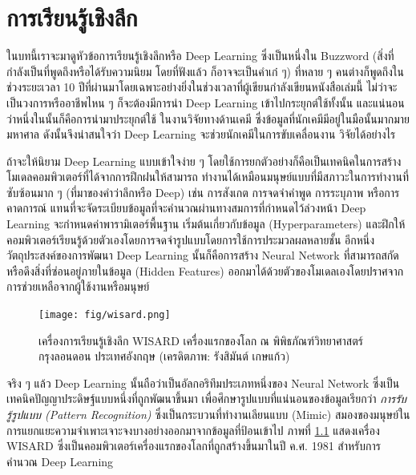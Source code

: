 

\chapter{การเรียนรู้เชิงลึก}
\label{ch:dl}

ในบทนี้เราจะมาดูหัวข้อการเรียนรู้เชิงลึกหรือ Deep Learning ซึ่งเป็นหนึ่งใน Buzzword (สิ่งที่กำลังเป็นที่พูดถึงหรือได้รับความนิยม โดยที่ฟังแล้ว%
ก็อาจจะเป็นคำเก๋ ๆ) ที่หลาย ๆ คนต่างก็พูดถึงในช่วงระยะเวลา 10 ปีที่ผ่านมาโดยเฉพาะอย่างยิ่งในช่วงเวลาที่ผู้เขียนกำลังเขียนหนังสือเล่มนี้ 
ไม่ว่าจะเป็นวงการหรืออาชีพไหน ๆ ก็จะต้องมีการนำ Deep Learning เข้าไปกระยุกต์ใช้ทั้งนั้น และแน่นอนว่าหนึ่งในนั้นก็คือการนำมาประยุกต์ใช้%
ในงานวิจัยทางด้านเคมี ซึ่งข้อมูลที่นักเคมีมีอยู่ในมือนั้นมากมายมหาศาล ดังนั้นจึงน่าสนใจว่า Deep Learning จะช่วยนักเคมีในการขับเคลื่อนงาน%
วิจัยได้อย่างไร

ถ้าจะให้นิยาม Deep Learning แบบเข้าใจง่าย ๆ โดยใช้การยกตัวอย่างก็คือเป็นเทคนิคในการสร้างโมเดลคอมพิวเตอร์ที่ได้จากการฝึกฝนให้สามารถ%
ทำงานได้เหมือนมนุษย์แบบที่มีสภาวะในการทำงานที่ซับซ้อนมาก ๆ (ที่มาของคำว่าลึกหรือ Deep) เช่น การสังเกต การจดจำคำพูด การระบุภาพ 
หรือการคาดการณ์ แทนที่จะจัดระเบียบข้อมูลที่จะคำนวณผ่านทางสมการที่กำหนดไว้ล่วงหน้า Deep Learning จะกำหนดค่าพารามิเตอร์พื้นฐาน%
เริ่มต้นเกี่ยวกับข้อมูล (Hyperparameters) และฝึกให้คอมพิวเตอร์เรียนรู้ด้วยตัวเองโดยการจดจำรูปแบบโดยการใช้การประมวลผลหลายชั้น
อีกหนึ่งวัตถุประสงค์ของการพัฒนา Deep Learning นั้นก็คือการสร้าง Neural Network ที่สามารถสกัดหรือดึงสิ่งที่ซ่อนอยู่ภายในข้อมูล (Hidden 
Features) ออกมาได้ด้วยตัวของโมเดลเองโดยปราศจากการช่วยเหลือจากผู้ใช้งานหรือมนุษย์

\begin{figure}[H]
    \centering
    \texttt{[image: fig/wisard.png]}
    \caption{เครื่องการเรียนรู้เชิงลึก WISARD เครื่องแรกของโลก ณ พิพิธภัณฑ์วิทยาศาสตร์ กรุงลอนดอน ประเทศอังกฤษ 
    (เครดิตภาพ: รังสิมันต์ เกษแก้ว)}
    \label{fig:wisard}
\end{figure}

จริง ๆ แล้ว Deep Learning นั้นถือว่าเป็นอัลกอริทึมประเภทหนึ่งของ Neural Network ซึ่งเป็นเทคนิคปัญญาประดิษฐ์แบบหนึ่งที่ถูกพัฒนาขึ้นมา%
เพื่อศึกษารูปแบบที่แน่นอนของข้อมูลเรียกว่า \textit{การรับรู้รูปแบบ (Pattern Recognition)} ซึ่งเป็นกระบวนที่ทำงานเลียนแบบ (Mimic) 
สมองของมนุษย์ในการแยกแยะความจำเพาะเจาะจงบางอย่างออกมาจากข้อมูลที่ป้อนเข้าไป ภาพที่ \ref{fig:wisard} แสดงเครื่อง WISARD 
ซึ่งเป็นคอมพิวเตอร์เครื่องแรกของโลกที่ถูกสร้างขึ้นมาในปี ค.ศ. 1981 สำหรับการคำนวณ Deep Learning

